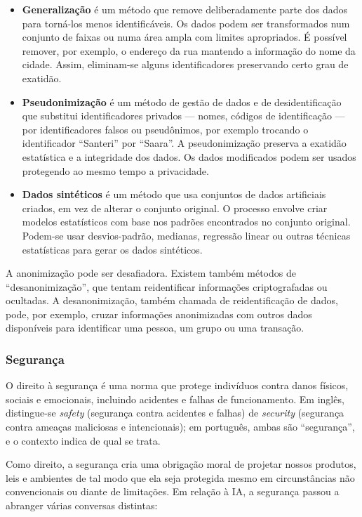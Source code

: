 \documentclass[
  11pt,
]{article}
\begin{document}
\begin{itemize}
\item
  \textbf{Generalização} é um método que remove deliberadamente parte
  dos dados para torná-los menos identificáveis. Os dados podem ser
  transformados num conjunto de faixas ou numa área ampla com limites
  apropriados. É possível remover, por exemplo, o endereço da rua
  mantendo a informação do nome da cidade. Assim, eliminam-se alguns
  identificadores preservando certo grau de exatidão.
\item
  \textbf{Pseudonimização} é um método de gestão de dados e de
  desidentificação que substitui identificadores privados --- nomes,
  códigos de identificação --- por identificadores falsos ou
  pseudônimos, por exemplo trocando o identificador ``Santeri'' por
  ``Saara''. A pseudonimização preserva a exatidão estatística e a
  integridade dos dados. Os dados modificados podem ser usados
  protegendo ao mesmo tempo a privacidade.
\item
  \textbf{Dados sintéticos} é um método que usa conjuntos de dados
  artificiais criados, em vez de alterar o conjunto original. O processo
  envolve criar modelos estatísticos com base nos padrões encontrados no
  conjunto original. Podem-se usar desvios-padrão, medianas, regressão
  linear ou outras técnicas estatísticas para gerar os dados sintéticos.
\end{itemize}

A anonimização pode ser desafiadora. Existem também métodos de
``desanonimização'', que tentam reidentificar informações criptografadas
ou ocultadas. A desanonimização, também chamada de reidentificação de
dados, pode, por exemplo, cruzar informações anonimizadas com outros
dados disponíveis para identificar uma pessoa, um grupo ou uma
transação.

\subsubsection{Segurança}\label{seguranuxe7a}

O direito à segurança é uma norma que protege indivíduos contra danos
físicos, sociais e emocionais, incluindo acidentes e falhas de
funcionamento. Em inglês, distingue-se \emph{safety} (segurança contra
acidentes e falhas) de \emph{security} (segurança contra ameaças
maliciosas e intencionais); em português, ambas são ``segurança'', e o
contexto indica de qual se trata.

Como direito, a segurança cria uma obrigação moral de projetar nossos
produtos, leis e ambientes de tal modo que ela seja protegida mesmo em
circunstâncias não convencionais ou diante de limitações. Em relação à
IA, a segurança passou a abranger várias conversas distintas:
\end{document}
